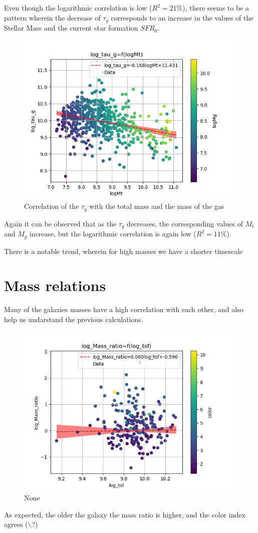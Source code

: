 \documentclass[a4paper,twocolumn]{article}
\begin{document}
Even though the logarithmic correlation is low (\(R^2 = 21\%\)), there seems to be a pattern wherein the decrease of \(\tau_g\) corresponds to an increase in the values of the Stellar Mass and the current star formation \(SFR_0\).

\begin{figure}[htbp]
\centering
\includegraphics[width=.9\linewidth]{./figs/logMt-log_tau_g-color_logMg.png}
\caption{\label{fig:Correlation of the $\tau_g$ with the total mass and the mass of the gas}Correlation of the \(\tau_g\) with the total mass and the mass of the gas}
\end{figure}


Again it can be observed that as the \(\tau_g\) decreases, the corresponding values of \(M_t\) and \(M_g\) increase, but the logarithmic correlation is again low (\(R^2 = 11\%\)).

There is a notable trend, wherein for high masses we have a shorter timescale

\section{Mass relations}
\label{sec:org630e948}

Many of the galaxies masses have a high correlation with each other, and also help us undarstand the previous calculations.

\begin{figure}[htbp]
\centering
\includegraphics[width=.9\linewidth]{./figs/log_tsf-log_Mass_ratio-color_color.png}
\caption{\label{fig:None}None}
\end{figure}

As expected, the older the galaxy the mass ratio is higher, and the color index agrees ($\backslash$?)




\pagebreak
\printbibliography
\end{document}
